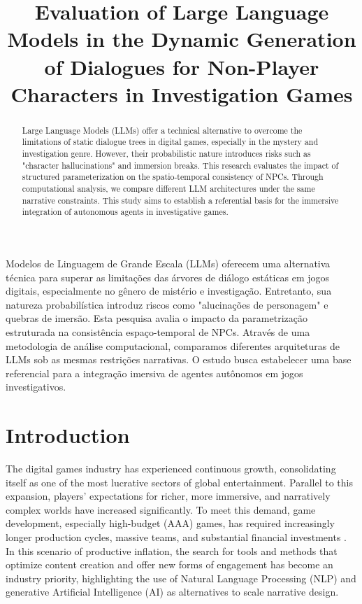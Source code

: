 \documentclass[12pt]{article}
\title{Evaluation of Large Language Models in the Dynamic Generation of Dialogues for Non-Player Characters in Investigation Games}
\author{}
\begin{document}
 

\maketitle

\begin{abstract}
Large Language Models (LLMs) offer a technical alternative to overcome the limitations of static dialogue trees in digital games, especially in the mystery and investigation genre. However, their probabilistic nature introduces risks such as "character hallucinations" and immersion breaks. This research evaluates the impact of structured parameterization on the spatio-temporal consistency of NPCs. Through computational analysis, we compare different LLM architectures under the same narrative constraints. This study aims to establish a referential basis for the immersive integration of autonomous agents in investigative games.
\end{abstract}

\begin{resumo}
Modelos de Linguagem de Grande Escala (LLMs) oferecem uma alternativa técnica para superar as limitações das árvores de diálogo estáticas em jogos digitais, especialmente no gênero de mistério e investigação. Entretanto, sua natureza probabilística introduz riscos como "alucinações de personagem" e quebras de imersão. Esta pesquisa avalia o impacto da parametrização estruturada na consistência espaço-temporal de NPCs. Através de uma metodologia de análise computacional, comparamos diferentes arquiteturas de LLMs sob as mesmas restrições narrativas. O estudo busca estabelecer uma base referencial para a integração imersiva de agentes autônomos em jogos investigativos.
\end{resumo}

\section{Introduction}

The digital games industry has experienced continuous growth, consolidating itself as one of the most lucrative sectors of global entertainment. Parallel to this expansion, players' expectations for richer, more immersive, and narratively complex worlds have increased significantly. To meet this demand, game development, especially high-budget (AAA) games, has required increasingly longer production cycles, massive teams, and substantial financial investments \cite{inserir_ref_custos_jogos}. In this scenario of productive inflation, the search for tools and methods that optimize content creation and offer new forms of engagement has become an industry priority, highlighting the use of Natural Language Processing (NLP) and generative Artificial Intelligence (AI) as alternatives to scale narrative design.
\end{document}
